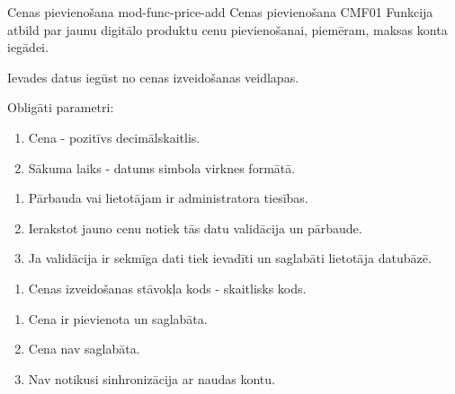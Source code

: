 \moduleFunctionTable
{Cenas pievienošana}
{mod-func-price-add}
{Cenas pievienošana}
{CMF01}
{
	Funkcija atbild par jaunu digitālo produktu cenu pievienošanai, piemēram, maksas konta iegādei.
}
{
	Ievades datus iegūst no cenas izveidošanas veidlapas.

	Obligāti parametri:
	\begin{enumerate}
		\item Cena - pozitīvs decimālskaitlis.
		\item Sākuma laiks - datums simbola virknes formātā.
	\end{enumerate}
}
{
	\begin{enumerate}
		\item Pārbauda vai lietotājam ir administratora tiesības.
		\item Ierakstot jauno cenu notiek tās datu validācija un pārbaude.
		\item Ja validācija ir sekmīga dati tiek ievadīti un saglabāti lietotāja datubāzē.
	\end{enumerate}
}
{
	\begin{enumerate}
		\item Cenas izveidošanas stāvokļa kods - skaitlisks kods.
	\end{enumerate}
}
{
	\begin{enumerate}
		\item Cena ir pievienota un saglabāta.
		\item Cena nav saglabāta.
		\item Nav notikusi sinhronizācija ar naudas kontu.
	\end{enumerate}
}
